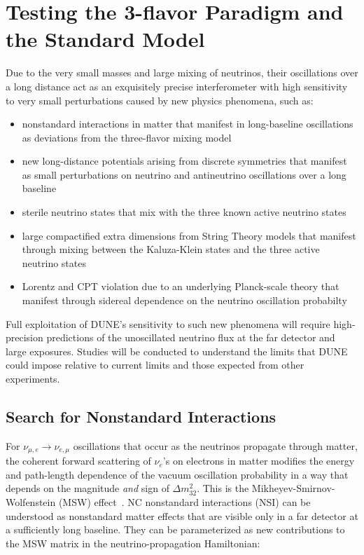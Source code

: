\section{Testing the 3-flavor Paradigm and the Standard Model}
\label{sec:physics-lbnosc-3nutests}

Due to the very small masses and large mixing of neutrinos, their oscillations over a long distance
  act as an exquisitely precise interferometer with high sensitivity to very small perturbations caused by 
  new physics phenomena, such as:
  \begin{itemize}
  \item nonstandard interactions in matter that manifest in
    long-baseline oscillations as deviations from the three-flavor mixing model
  \item new long-distance potentials arising from discrete symmetries
    that manifest as small perturbations on neutrino and antineutrino
    oscillations over a long baseline
  \item sterile neutrino states that mix with the three known active neutrino states
  \item large compactified extra dimensions from String Theory models that manifest through mixing
    between the Kaluza-Klein states and the three active neutrino
    states
   \item Lorentz and CPT violation due to an underlying Planck-scale theory that manifest through sidereal dependence on the neutrino oscillation probabilty
  \end{itemize}
  Full exploitation of DUNE's sensitivity to such new phenomena
  will require high-precision predictions of the unoscillated
  neutrino flux at the far detector and large exposures. Studies will be conducted to understand the
limits that DUNE could impose relative to current limits and those expected from other experiments.
  
\subsection{Search for Nonstandard Interactions}

For $\nu_{\mu,e} \rightarrow \nu_{e,\mu}$ 
oscillations that occur as the neutrinos propagate through matter,  
the coherent forward scattering of $\nu_e$'s on electrons in matter 
modifies the energy and path-length dependence of the vacuum oscillation 
probability in a way that depends on the magnitude \emph{and} sign of $\Delta m^2_{32}$. 
This is  the Mikheyev-Smirnov-Wolfenstein (MSW) effect~\cite{Mikheev:1986gs,Wolfenstein:1977ue}.
NC nonstandard interactions (NSI) can be understood as nonstandard
matter effects that are visible only in a far detector at a
sufficiently long baseline. 
They can be parameterized as new contributions
to the MSW matrix in the neutrino-propagation Hamiltonian:

